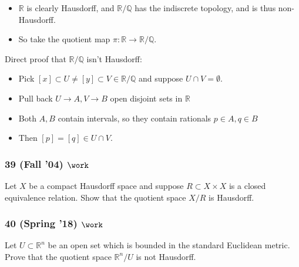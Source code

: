 \begin{solution}

\envlist

\begin{itemize}
\tightlist
\item
  \({\mathbb{R}}\) is clearly Hausdorff, and
  \({\mathbb{R}}/{\mathbb{Q}}\) has the indiscrete topology, and is thus
  non-Hausdorff.
\item
  So take the quotient map
  \(\pi:{\mathbb{R}}\to {\mathbb{R}}/{\mathbb{Q}}\).
\end{itemize}

Direct proof that \({\mathbb{R}}/{\mathbb{Q}}\) isn't Hausdorff:

\begin{itemize}
\tightlist
\item
  Pick
  \([x] \subset U \neq [y] \subset V \in {\mathbb{R}}/{\mathbb{Q}}\) and
  suppose \(U\cap V = \emptyset\).
\item
  Pull back \(U\to A, V\to B\) open disjoint sets in \({\mathbb{R}}\)
\item
  Both \(A, B\) contain intervals, so they contain rationals
  \(p\in A, q\in B\)
\item
  Then \([p] = [q] \in U\cap V\).
\end{itemize}

\end{solution}

\hypertarget{fall-04-work-1}{%
\subsubsection{\texorpdfstring{39 (Fall '04)
\(\work\)}{39 (Fall '04) \textbackslash work}}\label{fall-04-work-1}}

\begin{problem}[?]

Let \(X\) be a compact Hausdorff space and suppose
\(R \subset X \times X\) is a closed equivalence relation. Show that the
quotient space \(X/R\) is Hausdorff.

\end{problem}

\hypertarget{spring-18-work}{%
\subsubsection{\texorpdfstring{40 (Spring '18)
\(\work\)}{40 (Spring '18) \textbackslash work}}\label{spring-18-work}}

\begin{problem}[?]

Let \(U \subset {\mathbb{R}}^n\) be an open set which is bounded in the
standard Euclidean metric. Prove that the quotient space
\({\mathbb{R}}^n / U\) is not Hausdorff.

\end{problem}

